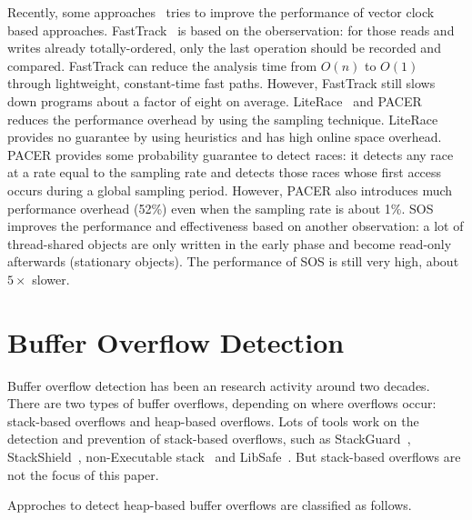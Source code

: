 Recently, some approaches~\cite{race:FastTrack, race:Pacer, race:LiteRace, race:SOS} tries to 
improve the performance of vector clock based approaches.
FastTrack~\cite{race:FastTrack} is based on the oberservation: for those reads and writes already totally-ordered, 
only the last operation should be recorded and compared. 
FastTrack can reduce the analysis time from $O(n)$ to $O(1)$ through lightweight, constant-time
fast paths. However, FastTrack still slows down programs about a factor of eight on average. 
LiteRace~\cite{race:LiteRace} and PACER~\cite{race:Pacer} reduces the performance overhead by using the sampling technique. 
LiteRace provides no guarantee by using heuristics and has high online space overhead. 
PACER provides some probability guarantee to detect races: 
it detects any race at a rate equal to the sampling rate and detects those races 
whose first access occurs during a global sampling period.
However, PACER also introduces much performance overhead (52\%) even when the sampling rate 
is about 1\%. 
SOS~\cite{race:SOS} improves the performance and effectiveness based on another observation: a lot of 
thread-shared objects are only written in the early phase and become read-only afterwards
(stationary objects). 
The performance of SOS is still very high, about $5\times$ slower. 
 
 
\section{Buffer Overflow Detection}

Buffer overflow detection has been an research activity around two decades. 
There are two types of buffer overflows, depending on where overflows occur:
stack-based overflows and heap-based overflows.
Lots of tools work on the detection and prevention of stack-based 
overflows, such as StackGuard~\cite{StackGuard}, StackShield~\cite{StackShield}, 
non-Executable stack~\cite{non-executablestack}
and LibSafe~\cite{Libsafe}. But stack-based overflows are not the focus of this paper. 

Approches to detect heap-based buffer overflows are classified as follows.  

